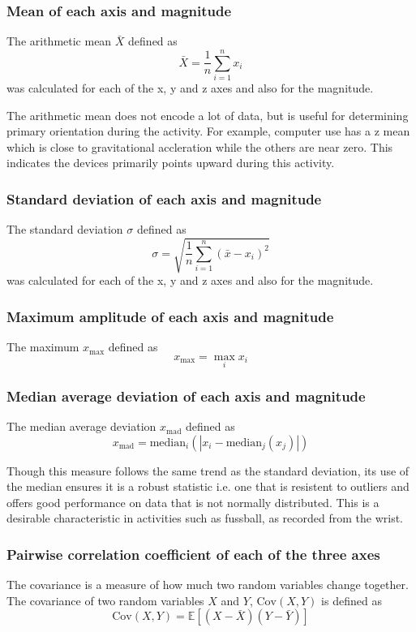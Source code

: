       \subsubsection{Mean of each axis and magnitude}
        The arithmetic mean $\bar{X}$ defined as $$\bar{X} = \frac{1}{n}\sum\limits_{i = 1}^{n}x_i$$ was calculated for each of the x, y and z axes and also for the magnitude.
        
        The arithmetic mean does not encode a lot of data, but is useful for determining primary orientation during the activity. For example, computer use has a z mean which is close to gravitational accleration while the others are near zero. This indicates the devices primarily points upward during this activity.
      
      \subsubsection{Standard deviation of each axis and magnitude}
        The standard deviation $\sigma$ defined as $$\sigma = \sqrt{\frac{1}{n}\sum\limits_{i = 1}^{n}(\bar{x}-x_i)^2}$$ was calculated for each of the x, y and z axes and also for the magnitude.
        
      \subsubsection{Maximum amplitude of each axis and magnitude}
        The maximum $x_{\max}$ defined as $$x_{\max} = \max_i x_i $$
      \subsubsection{Median average deviation of each axis and magnitude}
        The median average deviation $x_\mathrm{mad}$ defined as $$x_\mathrm{mad} = \mathrm{median}_i (|x_i - \mathrm{median}_j(x_j)|)$$
        
        Though this measure follows the same trend as the standard deviation, its use of the median ensures it is a robust statistic i.e. one that is resistent to outliers and offers good performance on data that is not normally distributed. This is a desirable characteristic in activities such as fussball, as recorded from the wrist.
      \subsubsection{Pairwise correlation coefficient of each of the three axes}
        The covariance is a measure of how much two random variables change together. The covariance of two random variables $X$ and $Y$, $\mathrm{Cov}(X, Y)$ is defined as $$\mathrm{Cov}(X, Y) = \mathbb{E}[(X - \bar{X})(Y - \bar{Y})]$$
        
